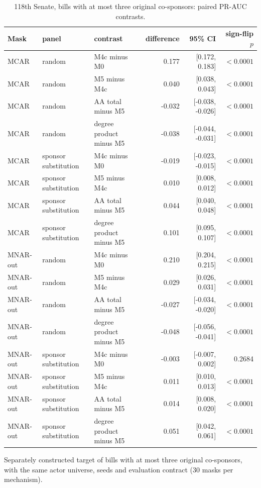 \begin{table}[tbp]
\centering
\small
\caption{118th Senate, bills with at most three original co-sponsors: paired PR-AUC contrasts.}
\label{tab:senate-limit-sensitivity}
\begin{tabular}{lllrrr}
\toprule
Mask & panel & contrast & difference & 95\% CI & sign-flip $p$ \\
\midrule
MCAR & random & M4c minus M0 & 0.177 & [0.172, 0.183] & $<0.0001$ \\
MCAR & random & M5 minus M4c & 0.040 & [0.038, 0.043] & $<0.0001$ \\
MCAR & random & AA total minus M5 & -0.032 & [-0.038, -0.026] & $<0.0001$ \\
MCAR & random & degree product minus M5 & -0.038 & [-0.044, -0.031] & $<0.0001$ \\
MCAR & sponsor substitution & M4c minus M0 & -0.019 & [-0.023, -0.015] & $<0.0001$ \\
MCAR & sponsor substitution & M5 minus M4c & 0.010 & [0.008, 0.012] & $<0.0001$ \\
MCAR & sponsor substitution & AA total minus M5 & 0.044 & [0.040, 0.048] & $<0.0001$ \\
MCAR & sponsor substitution & degree product minus M5 & 0.101 & [0.095, 0.107] & $<0.0001$ \\
MNAR-out & random & M4c minus M0 & 0.210 & [0.204, 0.215] & $<0.0001$ \\
MNAR-out & random & M5 minus M4c & 0.029 & [0.026, 0.031] & $<0.0001$ \\
MNAR-out & random & AA total minus M5 & -0.027 & [-0.034, -0.020] & $<0.0001$ \\
MNAR-out & random & degree product minus M5 & -0.048 & [-0.056, -0.041] & $<0.0001$ \\
MNAR-out & sponsor substitution & M4c minus M0 & -0.003 & [-0.007, 0.002] & 0.2684 \\
MNAR-out & sponsor substitution & M5 minus M4c & 0.011 & [0.010, 0.013] & $<0.0001$ \\
MNAR-out & sponsor substitution & AA total minus M5 & 0.014 & [0.008, 0.020] & $<0.0001$ \\
MNAR-out & sponsor substitution & degree product minus M5 & 0.051 & [0.042, 0.061] & $<0.0001$ \\
\bottomrule
\end{tabular}
\par\vspace{2pt}\footnotesize Separately constructed target of bills with at most three original co-sponsors, with the same actor universe, seeds and evaluation contract (30 masks per mechanism).
\end{table}